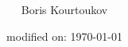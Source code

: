 
\title{\normalsize{\currentPostNumber} \currentPostTitle}
\author{\large{Boris Kourtoukov}}
\date{\small{modified on: \today}}

\maketitle
\smallskip